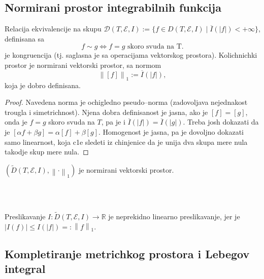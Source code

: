 \documentclass[a4paper,12pt]{article}
\newcommand{\RR}{\mathbb{R}}
\newcommand{\norm}[1]{\left\lVert#1\right\rVert}
\begin{document}
\subsection{Normirani prostor integrabilnih funkcija}

\begin{lema}
	Relacija ekvivalencije na skupu 
	$\mathcal D (T,\mathcal{E}, I) := \{f \in D(T,\mathcal E, I) \mid \overline{I}(|f|)< +\infty\}$,
	definisana sa 
	\[ f \sim g \iff f = g \text{ skoro svuda na T} .\] 
	je kongruencija (tj. saglasna je sa operacijama vektorskog prostora). Kolichnichki prostor je 
	normirani vektorski prostor, sa normom
	\[ \norm{[f]}_1 := \overline{I}(|f|) ,\] 
	koja je dobro definisana.
\end{lema}
\begin{proof}
	Navedena norma je ochigledno pseudo--norma (zadovoljava nejednakost trougla i simetrichnost). Njena dobra definisanost 
	je jasna, ako je $[f] = [g]$, onda je $f = g$ skoro svuda na $T$, pa je i $\overline{I}(|f|) = \overline{I}(|g|)$.
	Treba josh dokazati da je $[\alpha f + \beta g] = \alpha [f] + \beta [g]$. Homogenost je jasna, pa je dovoljno dokazati
	samo linearnost, koja c1e sledeti iz chinjenice da je unija dva skupa mere nula takodje skup mere nula.
\end{proof}
\begin{posl}
	$(\widetilde{D} (T,\mathcal{E}, I), \norm{\cdot}_1)$ je normirani vektorski prostor.
\end{posl}
\\ \\
\begin{nap}
	Preslikavanje $I:\widetilde{D} (T,\mathcal{E}, I) \to \RR$ je neprekidno linearno preslikavanje,
	jer je $|I(f)| \leq I(|f|) =:\norm{f}_1$.
\end{nap}

\subsection{Kompletiranje metrichkog prostora i Lebegov integral}
\end{document}
